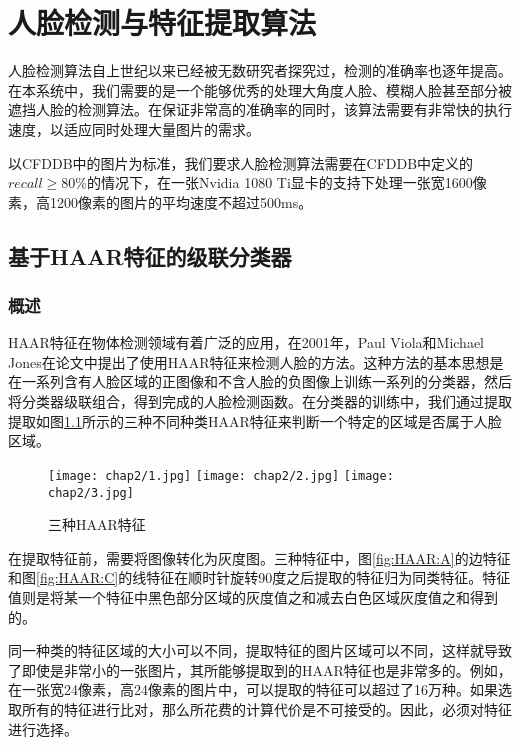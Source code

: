 \chapter{人脸检测与特征提取算法}
\label{chap:facedetection}

人脸检测算法自上世纪以来已经被无数研究者探究过，检测的准确率也逐年提高。在本系统中，我们需要的是一个能够优秀的处理大角度人脸、模糊人脸甚至部分被遮挡人脸的检测算法。在保证非常高的准确率的同时，该算法需要有非常快的执行速度，以适应同时处理大量图片的需求。

以CFDDB中的图片为标准，我们要求人脸检测算法需要在CFDDB中定义的$recall\geq 80\%$的情况下，在一张Nvidia 1080 Ti显卡的支持下处理一张宽1600像素，高1200像素的图片的平均速度不超过500ms。


\section{基于HAAR特征的级联分类器}

\subsection{概述}
HAAR特征在物体检测领域有着广泛的应用，在2001年，Paul Viola和Michael Jones在论文中提出了使用HAAR特征来检测人脸的方法\cite{viola2004robust}。这种方法的基本思想是在一系列含有人脸区域的正图像和不含人脸的负图像上训练一系列的分类器，然后将分类器级联组合，得到完成的人脸检测函数。在分类器的训练中，我们通过提取提取如图\ref{fig:HAAR}所示的三种不同种类HAAR特征来判断一个特定的区域是否属于人脸区域。

\begin{figure}[!htp]
	\centering
	{\texttt{[image: chap2/1.jpg]}}
	\hspace{4em}
	{\texttt{[image: chap2/2.jpg]}}
	\hspace{4em}
	{\texttt{[image: chap2/3.jpg]}}
	\caption{三种HAAR特征}
	\label{fig:HAAR}
\end{figure}

在提取特征前，需要将图像转化为灰度图。三种特征中，图\ref{fig:HAAR:A}的边特征和图\ref{fig:HAAR:C}的线特征在顺时针旋转90度之后提取的特征归为同类特征。特征值则是将某一个特征中黑色部分区域的灰度值之和减去白色区域灰度值之和得到的。

同一种类的特征区域的大小可以不同，提取特征的图片区域可以不同，这样就导致了即使是非常小的一张图片，其所能够提取到的HAAR特征也是非常多的。例如，在一张宽24像素，高24像素的图片中，可以提取的特征可以超过了16万种。如果选取所有的特征进行比对，那么所花费的计算代价是不可接受的。因此，必须对特征进行选择。

